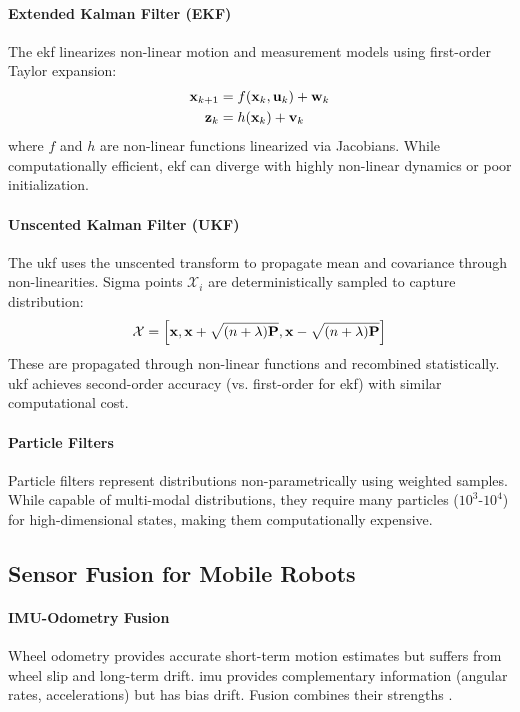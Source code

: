 \paragraph{Extended Kalman Filter (EKF)}
The \acrshort{ekf} \cite{Welch2006} linearizes non-linear motion and measurement models using first-order Taylor expansion:
\begin{align}
\mathbf{x}_{k+1} &= f(\mathbf{x}_k, \mathbf{u}_k) + \mathbf{w}_k \\
\mathbf{z}_k &= h(\mathbf{x}_k) + \mathbf{v}_k
\end{align}
where $f$ and $h$ are non-linear functions linearized via Jacobians. While computationally efficient, \acrshort{ekf} can diverge with highly non-linear dynamics or poor initialization.

\paragraph{Unscented Kalman Filter (UKF)}
The \acrshort{ukf} \cite{Julier2004} uses the unscented transform to propagate mean and covariance through non-linearities. Sigma points $\mathcal{X}_i$ are deterministically sampled to capture distribution:
\begin{equation}
\mathcal{X} = \left[ \mathbf{x}, \mathbf{x} + \sqrt{(n+\lambda)\mathbf{P}}, \mathbf{x} - \sqrt{(n+\lambda)\mathbf{P}} \right]
\end{equation}
These are propagated through non-linear functions and recombined statistically. \acrshort{ukf} achieves second-order accuracy (vs. first-order for \acrshort{ekf}) with similar computational cost.

\paragraph{Particle Filters}
Particle filters \cite{Thrun2005} represent distributions non-parametrically using weighted samples. While capable of multi-modal distributions, they require many particles ($10^3$-$10^4$) for high-dimensional states, making them computationally expensive.

\subsection{Sensor Fusion for Mobile Robots}

\paragraph{IMU-Odometry Fusion}
Wheel odometry provides accurate short-term motion estimates but suffers from wheel slip and long-term drift. \acrshort{imu} provides complementary information (angular rates, accelerations) but has bias drift. Fusion combines their strengths \cite{Martinelli2014}.

